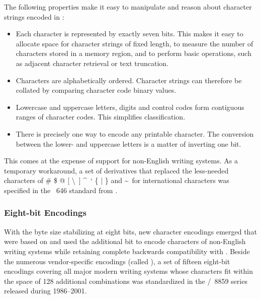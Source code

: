 The following properties make it easy to manipulate and reason about character
strings encoded in :
\begin{itemize}
  \item Each character is represented by exactly seven bits. This makes it easy
    to allocate space for character strings of fixed length, to measure the
    number of characters stored in a memory region, and to perform basic
    operations, such as adjacent character retrieval or text truncation.
  \item Characters are alphabetically ordered. Character strings can therefore
    be collated by comparing character code binary values.
  \item Lowercase and uppercase letters, digits and control codes form
    contiguous ranges of character codes. This simplifies classification.
  \item There is precisely one way to encode any printable character. The
    conversion between the lower- and uppercase letters is a matter of
    inverting one bit.
\end{itemize}
This comes at the expense of support for non-English writing systems. As a
temporary workaround, a set of  derivatives that replaced the
less-needed characters of \# \$ @ [ \textbackslash\ ] \textasciicircum\ ` \{ |
\} and \textasciitilde\ for international characters was specified in the
~646 standard from \citeyear{iso72}.~\cite{iso72}

\subsubsection{Eight-bit Encodings}
With the byte size stabilizing at eight bits, new character encodings emerged
that were based on  and used the additional bit to encode
characters of non-English writing systems while retaining complete backwards
compatibility with . Beside the numerous vendor-specific
encodings (called ), a set of fifteen eight-bit encodings
covering all major modern writing systems whose characters fit within the space
of 128 additional combinations was standardized in the
/~8859 series released during 1986--2001.


